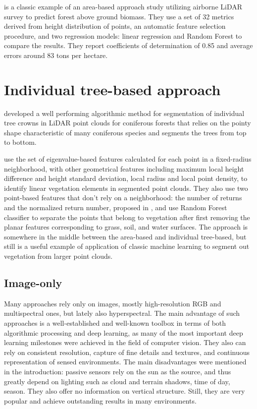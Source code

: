 \citet{kcEstimationAboveGroundForest2024} is a classic example of an area-based approach study utilizing airborne LiDAR survey to predict forest above ground biomass.
They use a set of 32 metrics derived from height distribution of points, an automatic feature selection procedure, and two regression models: linear regression and Random Forest to compare the results.
They report coefficients of determination of 0.85 and average errors around 83 tons per hectare.

\section{Individual tree-based approach}\label{sec-individual-tree-approach}

\citet{liNewMethodSegmenting2012} developed a well performing algorithmic method for segmentation of individual tree crowns in LiDAR point clouds for coniferous forests that relies on the pointy shape characteristic of many coniferous species and segments the trees from top to bottom.

\citet{lucasIdentificationLinearVegetation2019} use the set of eigenvalue-based features calculated for each point in a fixed-radius neighborhood, with other geometrical features including maximum local height difference and height standard deviation, local radius and local point density, to identify linear vegetation elements in segmented point clouds.
They also use two point-based features that don't rely on a neighborhood: the number of returns and the normalized return number, proposed in \citet{guoRelevanceAirborneLidar2011}, and use Random Forest classifier to separate the points that belong to vegetation after first removing the planar features corresponding to grass, soil, and water surfaces.
The approach is somewhere in the middle between the area-based and individual tree-based, but still is a useful example of application of classic machine learning to segment out vegetation from larger point clouds.

\subsection{Image-only}

Many approaches rely only on images, mostly high-resolution RGB and multispectral ones, but lately also hyperspectral.
The main advantage of such approaches is a well-established and well-known toolbox in terms of both algorithmic processing and deep learning, as many of the most important deep learning milestones were achieved in the field of computer vision.
They also can rely on consistent resolution, capture of fine details and textures, and continuous representation of sensed environments.
The main disadvantages were mentioned in the introduction: passive sensors rely on the sun as the source, and thus greatly depend on lighting such as cloud and terrain shadows, time of day, season.
They also offer no information on vertical structure.
Still, they are very popular and achieve outstanding results in many environments.

